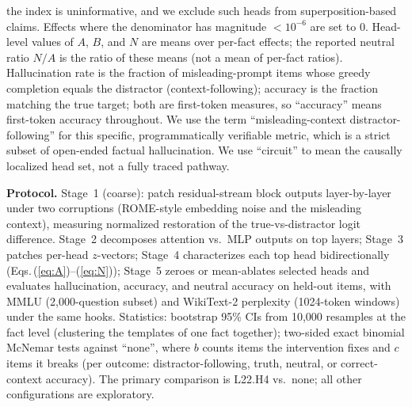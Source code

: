 \documentclass[paper]{ieice}
\newcommand{\spec}{L22.H4}
\begin{document}
the index is uninformative, and we exclude such heads from
superposition-based claims. Effects where the denominator has magnitude
$< 10^{-6}$ are set to 0. Head-level values of $A$, $B$, and $N$ are
means over per-fact effects; the reported neutral ratio $N/A$ is the
ratio of these means (not a mean of per-fact ratios). Hallucination
rate is the fraction of misleading-prompt items whose greedy completion
equals the distractor (context-following); accuracy is the fraction
matching the true target; both are first-token measures, so
``accuracy'' means first-token accuracy throughout. We use the term
``misleading-context distractor-following'' for this specific,
programmatically verifiable metric, which is a strict subset of
open-ended factual hallucination. We use ``circuit'' to mean the
causally localized head set, not a fully traced pathway.

\textbf{Protocol.} Stage~1 (coarse): patch residual-stream block
outputs layer-by-layer under two corruptions (ROME-style embedding noise and the misleading
context), measuring normalized restoration of
the true-vs-distractor logit difference. Stage~2 decomposes
attention vs.\ MLP outputs on top layers; Stage~3 patches per-head
$z$-vectors; Stage~4 characterizes each top head bidirectionally
(Eqs.\,(\ref{eq:A})--(\ref{eq:N})); Stage~5 zeroes or mean-ablates
selected heads and evaluates hallucination, accuracy, and neutral
accuracy on held-out items, with MMLU (2{,}000-question subset) and
WikiText-2 perplexity (1024-token windows) under the same hooks. Statistics: bootstrap 95\% CIs from 10{,}000 resamples at the
fact level (clustering the templates of one fact together); two-sided exact binomial McNemar tests against
``none'', where $b$ counts items the intervention fixes and $c$ items it
breaks (per outcome: distractor-following, truth, neutral, or
correct-context accuracy). The primary comparison is \spec{} vs.\ none; all other
configurations are exploratory.
\end{document}
